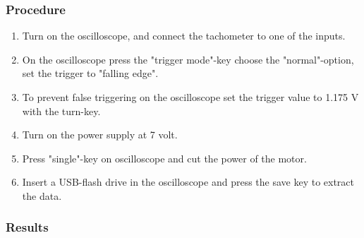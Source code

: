 \subsubsection{Procedure}

\begin{enumerate}
  \item Turn on the oscilloscope, and connect the tachometer to one of the inputs.
  \item On the oscilloscope press the "trigger mode"-key choose the "normal"-option, set the trigger to "falling edge".
  \item To prevent false triggering on the oscilloscope set the trigger value to \num{1,175} V with the turn-key.
  \item Turn on the power supply at 7 volt.
  \item Press "single"-key on oscilloscope and cut the power of the motor.
  \item Insert a USB-flash drive in the oscilloscope and press the save key to extract the data.
\end{enumerate}

\subsubsection{Results}

